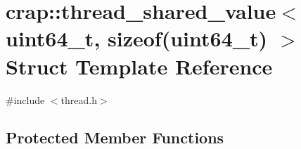 \hypertarget{structcrap_1_1thread__shared__value_3_01uint64__t_00_01sizeof_07uint64__t_08_01_4}{\section{crap\+:\+:thread\+\_\+shared\+\_\+value$<$ uint64\+\_\+t, sizeof(uint64\+\_\+t) $>$ Struct Template Reference}
\label{structcrap_1_1thread__shared__value_3_01uint64__t_00_01sizeof_07uint64__t_08_01_4}
}


{\ttfamily \#include $<$thread.\+h$>$}

\subsection*{Protected Member Functions}
